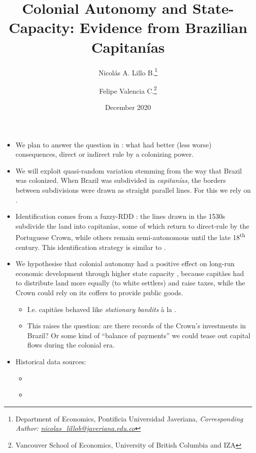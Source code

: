 \documentclass[11pt,a4paper]{article}
\title{Colonial Autonomy and State-Capacity: Evidence from Brazilian Capitan\'ias}
\date{December 2020}
\author{Nicol\'as A. Lillo B.\thanks{Department of Economics, Pontificia Universidad Javeriana, \emph{Corresponding Author: \href{mailto:nicolas_lillob@javeriana.edu.co}{nicolas\_lillob@javeriana.edu.co}}} \and Felipe Valencia C.\thanks{Vancouver School of Economics, University of British Columbia and IZA}}
\begin{document}
	\maketitle
	
	\begin{itemize}
		\item We plan to answer the question in \textcite{Iyer2010}: what had better (less worse) consequences, direct or indirect rule by a colonizing power.
		\item We will exploit quasi-random variation stemming from the way that Brazil was colonized. When Brazil was subdivided in \emph{capitan\'ias}, the borders between subdivisions were drawn as straight parallel lines. For this we rely on \textcite{Cintra2013}.
		\item Identification comes from a fuzzy-RDD \parencite{Cattaneo2019,Cattaneo2019a}: the lines drawn in the 1530s subdivide the land into capitan\'ias, some of which return to direct-rule by the Portuguese Crown, while others remain semi-autonomous until the late 18\textsuperscript{th} century. This identification strategy is similar to \textcite{Michalopoulos2014}.
		\item We hypothesise that colonial autonomy had a positive effect on long-run economic development through higher state capacity \parencite{Besley2009}, because capit\~aes had to distribute land more equally (to white settlers) and raise taxes, while the Crown could rely on its coffers to provide public goods. 
		\begin{itemize}
			\item I.e. capit\~aes behaved like \emph{stationary bandits} \`{a} la \textcite{Olson1993}.
			\item This raises the question: are there records of the Crown's investments in Brazil? Or some kind of ``balance of payments'' we could tease out capital flows during the colonial era.
		\end{itemize}
		\item Historical data sources:
		\begin{itemize}
			\item \textcite{Naritomi2007,Naritomi2012}
			\item \textcite{Fujiwara2017}
		\end{itemize}
	\end{itemize}

	\clearpage
	\printbibliography
	
\end{document}
